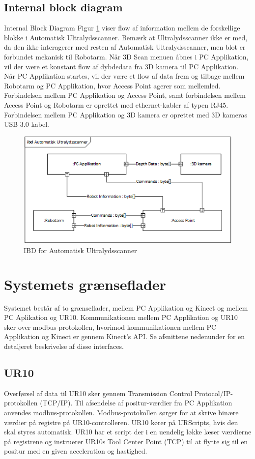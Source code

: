 \subsection{Internal block diagram}
Internal Block Diagram Figur \ref{IBD} viser flow af information mellem de forskellige blokke i Automatisk Ultralydsscanner.
Bemærk at Ultralydsscanner ikke er med, da den ikke interagerer med resten af Automatisk Ultralydsscanner, men blot er forbundet mekanisk til Robotarm.
Når 3D Scan menuen åbnes i PC Applikation, vil der være et konstant flow af dybdedata fra 3D kamera til PC Applikation.
Når PC Applikation startes, vil der være et flow af data frem og tilbage mellem Robotarm og PC Applikation, hvor Access Point agerer som mellemled. 
Forbindelsen mellem PC Applikation og Access Point, samt forbindelsen mellem Access Point og Robotarm er oprettet med ethernet-kabler af typen RJ45.
Forbindelsen mellem PC Applikation og 3D kamera er oprettet med 3D kameras USB 3.0 kabel. 

\begin{figure}[H]
    \centering
    \includegraphics[width=1\textwidth]{figurer/d/Design/IBD}
    \caption{IBD for Automatisk Ultralydsscanner}
    \label{IBD}
\end{figure}

\section{Systemets grænseflader}
Systemet består af to grænseflader, mellem PC Applikation og Kinect og mellem PC Aplikation og UR10. Kommunikationen mellem PC Applikation og UR10 sker over modbus-protokollen, hvorimod kommunikationen mellem PC Applikation og Kinect er gennem Kinect's API.
Se afsnittene nedenunder for en detaljeret beskrivelse af disse interfaces.

\subsection{UR10}
Overførsel af data til UR10 sker gennem Transmission Control Protocol/IP-protokollen (TCP/IP). Til afsendelse af positur-værdier fra PC Applikation anvendes modbus-protokollen. Modbus-protokollen sørger for at skrive binære værdier på registre på UR10-controlleren. UR10 kører på URScripts, hvis den skal styres automatisk. UR10 har et script der i en uendelig løkke læser værdierne på registrene og instruerer UR10s Tool Center Point (TCP) til at flytte sig til en positur med en given acceleration og hastighed.

